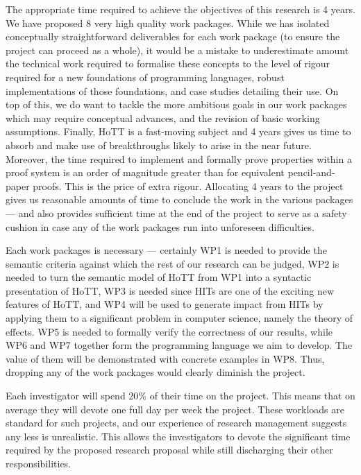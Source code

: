 \documentclass[a4paper,11pt]{article}
\begin{document}
 The appropriate
time required to achieve the objectives of this research is 4
years. We have proposed 8 very high quality work packages. While we
has isolated conceptually straightforward deliverables for each work
package (to ensure the project can proceed as a whole), it would be a
mistake to underestimate amount the technical work required to
formalise these concepts to the level of rigour required for a new
foundations of programming languages, robust implementations of those
foundations, and case studies detailing their use. On top of this,
we do want to tackle the more ambitious goals in our work packages
which may require conceptual
advances,  and the revision of basic working assumptions. Finally,
HoTT is a fast-moving subject and 4 years gives us time
to absorb and make use of breakthroughs likely to arise in the near
future. 
Moreover, the time required to implement and formally prove properties
within a proof system is an order of magnitude greater than for
equivalent pencil-and-paper proofs. This is the price of extra rigour.
Allocating 4 years to the
project gives us reasonable amounts of time to conclude the work in
the various packages
--- and also
provides sufficient time at the end of the project to serve as a
safety cushion in case any of the work packages run into unforeseen
difficulties.

\noindent Each work packages is necessary --- certainly WP1 is needed
to provide the semantic criteria against which the 
rest of our research can be judged, WP2 is needed to turn the semantic
model of HoTT from WP1 into a syntactic presentation of HoTT, WP3 is
needed since HITs are one of the exciting new features of HoTT, and
WP4 will be used to generate impact from HITs by applying them to a
significant problem in computer science, namely the theory of
effects. WP5 is needed to formally verify the correctness of our results, while WP6 and WP7 together form the programming language
we aim to develop. The value of them will be demonstrated with
concrete examples in WP8.  Thus, dropping any of the work packages
would clearly diminish the project.

\vspace{0.02in}

Each investigator will spend 20\% of their time on the project.
This means that on average they will devote one
full day per week the project. These workloads are standard for such projects, and
our experience of research management suggests any less is 
unrealistic. This allows the investigators to devote the significant
time required by the proposed research proposal while still discharging
their other responsibilities.
\end{document}
